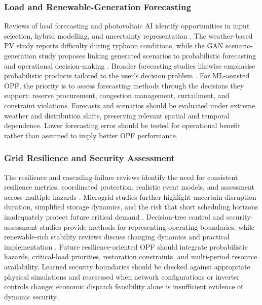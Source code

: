 \documentclass[a4paper,fleqn]{cas-sc}
\begin{document}
\subsubsection{Load and Renewable-Generation Forecasting}\label{subsubsec:gaps_forecasting}

Reviews of load forecasting and photovoltaic AI identify opportunities in input selection, hybrid modelling, and uncertainty representation \cite{raza2015review,mellit2008artificial}. The weather-based PV study reports difficulty during typhoon conditions, while the GAN scenario-generation study proposes linking generated scenarios to probabilistic forecasting and operational decision-making \cite{opfRef023,chen2018model}. Broader forecasting studies likewise emphasise probabilistic products tailored to the user's decision problem \cite{opfRef062,petropoulos2022forecasting}. For ML-assisted OPF, the priority is to assess forecasting methods through the decisions they support: reserve procurement, congestion management, curtailment, and constraint violations. Forecasts and scenarios should be evaluated under extreme weather and distribution shifts, preserving relevant spatial and temporal dependence. Lower forecasting error should be tested for operational benefit rather than assumed to imply better OPF performance.

\subsubsection{Grid Resilience and Security Assessment}\label{subsubsec:gaps_resilience}

The resilience and cascading-failure reviews identify the need for consistent resilience metrics, coordinated protection, realistic event models, and assessment across multiple hazards \cite{opfRef031,haes2019survey}. Microgrid studies further highlight uncertain disruption duration, simplified storage dynamics, and the risk that short scheduling horizons inadequately protect future critical demand \cite{opfRef057,opfRef078}. Decision-tree control and security-assessment studies provide methods for representing operating boundaries, while renewable-rich stability reviews discuss changing dynamics and practical implementation \cite{opfRef015,zhang2022data,ali2025power}. Future resilience-oriented OPF should integrate probabilistic hazards, critical-load priorities, restoration constraints, and multi-period resource availability. Learned security boundaries should be checked against appropriate physical simulations and reassessed when network configurations or inverter controls change; economic dispatch feasibility alone is insufficient evidence of dynamic security.
\end{document}
